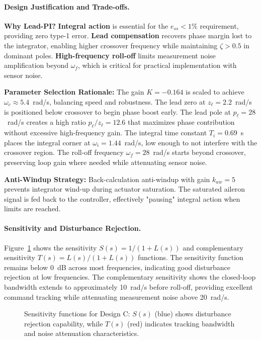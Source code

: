 \paragraph{Design Justification and Trade-offs.}

\textbf{Why Lead-PI?} \textbf{Integral action} is essential for the $e_{ss} < 1\%$ requirement, providing zero type-1 error. \textbf{Lead compensation} recovers phase margin lost to the integrator, enabling higher crossover frequency while maintaining $\zeta > 0.5$ in dominant poles. \textbf{High-frequency roll-off} limits measurement noise amplification beyond $\omega_f$, which is critical for practical implementation with sensor noise.

\textbf{Parameter Selection Rationale:} The gain $K=-0.164$ is scaled to achieve $\omega_c \approx 5.4$~rad/s, balancing speed and robustness. The lead zero at $z_\ell = 2.2$~rad/s is positioned below crossover to begin phase boost early. The lead pole at $p_\ell = 28$~rad/s creates a high ratio $p_\ell/z_\ell = 12.6$ that maximizes phase contribution without excessive high-frequency gain. The integral time constant $T_i = 0.69$~s places the integral corner at $\omega_i = 1.44$~rad/s, low enough to not interfere with the crossover region. The roll-off frequency $\omega_f = 28$~rad/s starts beyond crossover, preserving loop gain where needed while attenuating sensor noise.

\textbf{Anti-Windup Strategy:}
Back-calculation anti-windup with gain $k_{aw}=5$ prevents integrator wind-up during actuator saturation. The saturated aileron signal is fed back to the controller, effectively "pausing" integral action when limits are reached.

\paragraph{Sensitivity and Disturbance Rejection.}
Figure~\ref{fig:sensitivity_functions} shows the sensitivity $S(s) = 1/(1+L(s))$ and complementary sensitivity $T(s) = L(s)/(1+L(s))$ functions. The sensitivity function remains below 0~dB across most frequencies, indicating good disturbance rejection at low frequencies. The complementary sensitivity shows the closed-loop bandwidth extends to approximately 10~rad/s before roll-off, providing excellent command tracking while attenuating measurement noise above 20~rad/s.

\begin{figure}[h!]
\centering
\resizebox{0.8\textwidth}{!}{}
\caption{Sensitivity functions for Design C: $S(s)$ (blue) shows disturbance rejection capability, while $T(s)$ (red) indicates tracking bandwidth and noise attenuation characteristics.}
\label{fig:sensitivity_functions}
\end{figure}

